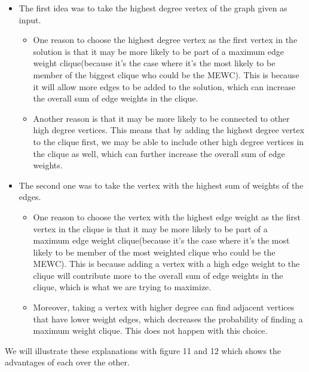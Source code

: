 \begin{itemize}
    \item The first idea was to take the highest degree vertex of the graph given as input.
          \begin{itemize}
              \item One reason to choose the highest degree vertex as the first vertex in the solution is that it may be more likely to be part of a maximum edge weight clique(because it's the case where it's the most likely to be member of the biggest clique who could be the MEWC). This is because it will allow more edges to be added to the solution, which can increase the overall sum of edge weights in the clique.
              \item Another reason is that it may be more likely to be connected to other high degree vertices. This means that by adding the highest degree vertex to the clique first, we may be able to include other high degree vertices in the clique as well, which can further increase the overall sum of edge weights.
          \end{itemize}
    \item The second one was to take the vertex with the highest sum of weights of the edges.
          \begin{itemize}
              \item One reason to choose the vertex with the highest edge weight as the first vertex in the clique is that it may be more likely to be part of a maximum edge weight clique(because it's the case where it's the most likely to be member of the most weighted clique who could be the MEWC). This is because adding a vertex with a high edge weight to the clique will contribute more to the overall sum of edge weights in the clique, which is what we are trying to maximize.
              \item Moreover, taking a vertex with higher degree can find adjacent vertices that have lower weight edges, which decreases the probability of finding a maximum weight clique. This does not happen with this choice.
          \end{itemize}
\end{itemize}

\vspace{1\baselineskip}

We will illustrate these explanations with figure 11 and 12 which shows the advantages of each over the other.
\bigskip

